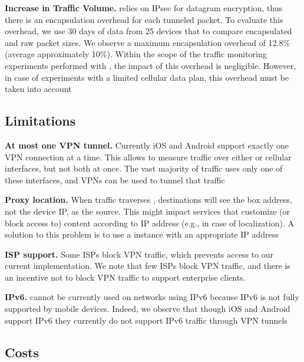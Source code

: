 \noindent\textbf{Increase in Traffic Volume.}
\meddle relies on IPsec for datagram encryption, thus there is an encapsulation overhead for each tunneled packet. 
To evaluate this overhead, we use 30 days of data from 25 devices that to compare encapsulated and raw packet sizes. 
We observe a maximum encapsulation overhead of 12.8\% (average approximately 10\%). 
Within the scope of the traffic monitoring experiments performed with \meddle, the impact of this overhead is negligible. 
However, in case of experiments with a limited cellular data plan, this overhead must be taken into account

\subsection{Limitations}

\noindent\textbf{At most one VPN tunnel.}
Currently iOS and Android support exactly one VPN connection at a time. 
This allows \meddle to measure traffic over either \wifi or cellular interfaces, but not both at once.
The vast majority of traffic uses only one of these interfaces, and VPNs can be used to tunnel that traffic

\noindent\textbf{Proxy location.} 
When traffic traverses \meddle, destinations will see the \meddle box address, not the device IP, as the source. 
This might impact services  that customize (or block access to) content according to IP address (e.g., in case of localization). 
A solution to this problem is to use a \meddle{} instance with an appropriate IP address

\noindent\textbf{ISP support.}
Some ISPs block VPN traffic, which prevents access to our current \meddle implementation. 
We note that few ISPs block VPN traffic, and there is an incentive not to block VPN traffic to support enterprise clients.

\noindent\textbf{IPv6.}
\meddle{} cannot be currently used on networks using IPv6 because IPv6 is not fully supported by mobile devices. 
Indeed, we observe that though iOS and Android support IPv6 they currently do not support IPv6 traffic through VPN tunnels




\subsection{Costs}

